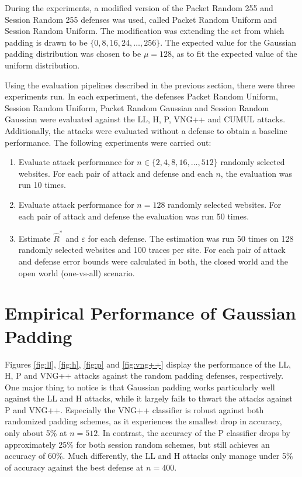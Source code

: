 \documentclass[
	ruledheaders=chapter,
	class=report,
	thesis={type=master, department=inf},
	accentcolor=1c,
	custommargins=true,
	marginpar=false,
	parskip=half-,
	fontsize=11pt,
]{tudapub}
\begin{document}
	During the experiments, a modified version of the Packet Random 255 and Session Random 255 defenses was used, called Packet Random Uniform and Session Random Uniform. The modification was extending the set from which padding is drawn to be $\{0, 8, 16, 24, \ldots, 256\}$. The expected value for the Gaussian padding distribution was chosen to be $\mu = 128$, as to fit the expected value of the uniform distribution.
	
	Using the evaluation pipelines described in the previous section, there were three experiments run. In each experiment, the defenses Packet Random Uniform, Session Random Uniform, Packet Random Gaussian and Session Random Gaussian were evaluated against the LL, H, P, VNG++ and CUMUL attacks. Additionally, the attacks were evaluated without a defense to obtain a baseline performance. The following experiments were carried out:
	
	\begin{enumerate}
		\item Evaluate attack performance for $n \in \{2, 4, 8, 16, \ldots, 512\}$ randomly selected websites. For each pair of attack and defense and each $n$, the evaluation was run 10 times.
		\item Evaluate attack performance for $n = 128$ randomly selected websites. For each pair of attack and defense the evaluation was run 50 times.
		\item Estimate $\widehat{R}^*$ and $\varepsilon$ for each defense. The estimation was run 50 times on 128 randomly selected websites and 100 traces per site. For each pair of attack and defense error bounds were calculated in both, the closed world and the open world (one-vs-all) scenario.
	\end{enumerate}

	\section{Empirical Performance of Gaussian Padding}
	\label{performance}
	
	Figures \ref{fig:ll}, \ref{fig:h}, \ref{fig:p} and \ref{fig:vng++} display the performance of the LL, H, P and VNG++ attacks against the random padding defenses, respectively. One major thing to notice is that Gaussian padding works particularly well against the LL and H attacks, while it largely fails to thwart the attacks against P and VNG++. Especially the VNG++ classifier is robust against both randomized padding schemes, as it experiences the smallest drop in accuracy, only about 5\% at $n = 512$. In contrast, the accuracy of the P classifier drops by approximately 25\% for both session random schemes, but still achieves an accuracy of 60\%. Much differently, the LL and H attacks only manage under 5\% of accuracy against the best defense at $n = 400$.
	
\end{document}

